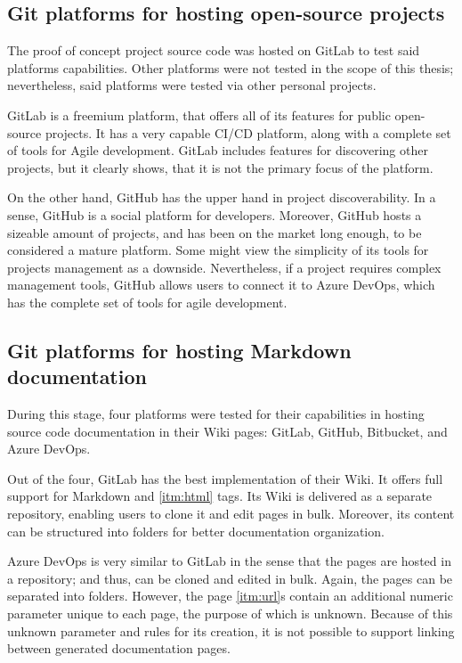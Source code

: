\subsection{Git platforms for hosting open-source projects}

The proof of concept project source code was hosted on GitLab to test said platforms capabilities. Other platforms were not tested in the scope of this thesis; nevertheless, said platforms were tested via other personal projects.

GitLab is a freemium platform, that offers all of its features for public open-source projects. It has a very capable CI/CD platform, along with a complete set of tools for Agile development. GitLab includes features for discovering other projects, but it clearly shows, that it is not the primary focus of the platform.

On the other hand, GitHub has the upper hand in project discoverability. In a sense, GitHub is a social platform for developers. Moreover, GitHub hosts a sizeable amount of projects, and has been on the market long enough, to be considered a mature platform. Some might view the simplicity of its tools for projects management as a downside. Nevertheless, if a project requires complex management tools, GitHub allows users to connect it to Azure DevOps, which has the complete set of tools for agile development.

\subsection{Git platforms for hosting Markdown documentation}

During this stage, four platforms were tested for their capabilities in hosting source code documentation in their Wiki pages: GitLab, GitHub, Bitbucket, and Azure DevOps.

Out of the four, GitLab has the best implementation of their Wiki. It offers full support for Markdown and \ref{itm:html} tags.
Its Wiki is delivered as a separate repository, enabling users to clone it and edit pages in bulk. Moreover, its content can be structured into folders for better documentation organization.

Azure DevOps is very similar to GitLab in the sense that the pages are hosted in a repository; and thus, can be cloned and edited in bulk. Again, the pages can be separated into folders. However, the page \ref{itm:url}s contain an additional numeric parameter unique to each page, the purpose of which is unknown. Because of this unknown parameter and rules for its creation, it is not possible to support linking between generated documentation pages.


